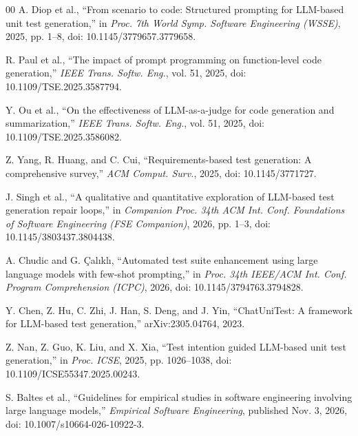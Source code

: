 \documentclass[conference]{IEEEtran}
\begin{document}
\begin{thebibliography}{00}
A. Diop et al., ``From scenario to code: Structured prompting for LLM-based unit test generation,'' in \emph{Proc. 7th World Symp. Software Engineering (WSSE)}, 2025, pp. 1--8, doi: 10.1145/3779657.3779658.

R. Paul et al., ``The impact of prompt programming on function-level code generation,'' \emph{IEEE Trans. Softw. Eng.}, vol. 51, 2025, doi: 10.1109/TSE.2025.3587794.

Y. Ou et al., ``On the effectiveness of LLM-as-a-judge for code generation and summarization,'' \emph{IEEE Trans. Softw. Eng.}, vol. 51, 2025, doi: 10.1109/TSE.2025.3586082.

Z. Yang, R. Huang, and C. Cui, ``Requirements-based test generation: A comprehensive survey,'' \emph{ACM Comput. Surv.}, 2025, doi: 10.1145/3771727.

J. Singh et al., ``A qualitative and quantitative exploration of LLM-based test generation repair loops,'' in \emph{Companion Proc. 34th ACM Int. Conf. Foundations of Software Engineering (FSE Companion)}, 2026, pp. 1--3, doi: 10.1145/3803437.3804438.

A. Chudic and G. \c{C}al\i kl\i, ``Automated test suite enhancement using large language models with few-shot prompting,'' in \emph{Proc. 34th IEEE/ACM Int. Conf. Program Comprehension (ICPC)}, 2026, doi: 10.1145/3794763.3794828.

Y. Chen, Z. Hu, C. Zhi, J. Han, S. Deng, and J. Yin, ``ChatUniTest: A framework for LLM-based test generation,'' arXiv:2305.04764, 2023.

Z. Nan, Z. Guo, K. Liu, and X. Xia, ``Test intention guided LLM-based unit test generation,'' in \emph{Proc. ICSE}, 2025, pp. 1026--1038, doi: 10.1109/ICSE55347.2025.00243.

S. Baltes et al., ``Guidelines for empirical studies in software engineering involving large language models,'' \emph{Empirical Software Engineering}, published Nov. 3, 2026, doi: 10.1007/s10664-026-10922-3.
\end{thebibliography}
\end{document}
